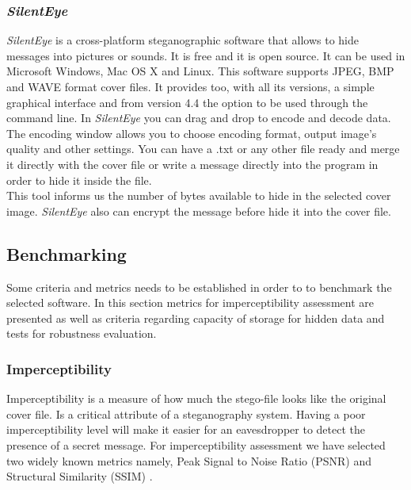 \documentclass[11pt]{article}
\begin{document}
\subsubsection{\textit{SilentEye}}
\textit{SilentEye} is a cross-platform steganographic software that allows to hide messages into pictures or sounds. It is free and it is open source. It can be used in Microsoft Windows, Mac OS X and Linux. 
This software supports JPEG, BMP and WAVE format cover files. It provides too, with all its versions, a simple graphical interface and from version 4.4 the option to be used through the command line. 
In \textit{SilentEye} you can drag and drop to encode and decode data. The encoding window allows you to choose encoding format, output image’s quality and other settings. You can have a .txt or any other file ready and merge it directly with the cover file or write a message directly into the program in order to hide it inside the file.\\
This tool informs us the number of bytes available to hide in the selected cover image.
\textit{SilentEye} also can encrypt the message before hide it into the cover file. 


\subsection{Benchmarking}

Some criteria and metrics needs to be established in order to to benchmark the selected software.
In this section metrics for imperceptibility assessment are presented as well as criteria regarding capacity of storage for
hidden data and tests for robustness evaluation.

\subsubsection{Imperceptibility}

Imperceptibility is a measure of how much the stego-file
looks like the original cover file. Is a critical attribute of a steganography system. Having a poor imperceptibility level will make it 
easier for an eavesdropper to detect the presence of a secret message. For imperceptibility assessment we have selected
two widely known metrics namely, Peak Signal to Noise Ratio (PSNR) and Structural Similarity (SSIM) \cite{Rabie-2019}.
\end{document}
